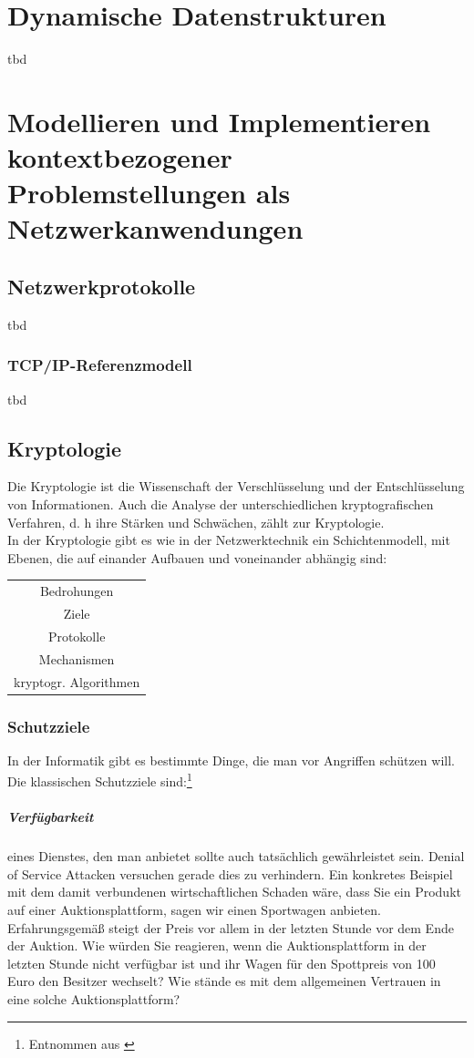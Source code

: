 \documentclass[a4paper,10pt,DIV9, BCOR12mm, oneside,openright,openbib]{scrreprt}
\theoremstyle{definition}
\theoremstyle{plain}
\begin{document}
\chapter{Dynamische Datenstrukturen}
tbd

\chapter[Modellation und Implementation von Netzwerkanwendungen]{Modellieren  und Implementieren  kontextbezogener  Problemstellungen als 
Netzwerkanwendungen}
\section{Netzwerkprotokolle}
tbd
\subsection{TCP/IP-Referenzmodell}
tbd
\section{Kryptologie}
Die Kryptologie ist die Wissenschaft der Verschlüsselung und der Entschlüsselung von Informationen. Auch die Analyse der unterschiedlichen kryptografischen Verfahren, d. h ihre Stärken und Schwächen, zählt zur Kryptologie. \\
In der Kryptologie gibt es wie in der Netzwerktechnik ein Schichtenmodell, mit Ebenen, die auf einander Aufbauen und voneinander abhängig sind:\\
\begin{center}
\begin{tabular}{c}
Bedrohungen\\
Ziele\\
Protokolle\\
Mechanismen\\
kryptogr. Algorithmen
\end{tabular}
\end{center}

\subsection{Schutzziele}
In der Informatik gibt es bestimmte Dinge, die man vor Angriffen schützen will. Die klassischen Schutzziele sind:\footnote{Entnommen aus \cite{Kluth2011}} \\

\paragraph{Verfügbarkeit} eines Dienstes, den man anbietet sollte auch tatsächlich gewährleistet sein. Denial of Service Attacken versuchen gerade dies zu verhindern. Ein konkretes Beispiel mit dem damit verbundenen wirtschaftlichen Schaden wäre, dass Sie
ein Produkt auf einer Auktionsplattform, sagen wir einen Sportwagen anbieten. Erfahrungsgemäß steigt der Preis vor allem in der letzten Stunde vor dem Ende der Auktion. Wie würden Sie reagieren, wenn die Auktionsplattform in der letzten Stunde nicht verfügbar ist und ihr Wagen für den Spottpreis von 100 Euro den
Besitzer wechselt? Wie stände es mit dem allgemeinen Vertrauen in eine solche Auktionsplattform?
\end{document}
